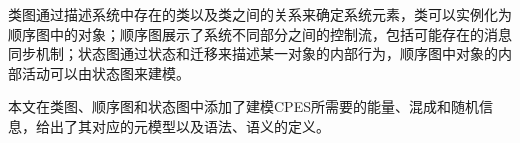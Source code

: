 	类图通过描述系统中存在的类以及类之间的关系来确定系统元素，类可以实例化为顺序图中的对象；顺序图展示了系统不同部分之间的控制流，包括可能存在的消息同步机制；状态图通过状态和迁移来描述某一对象的内部行为，顺序图中对象的内部活动可以由状态图来建模。
	
	本文在类图、顺序图和状态图中添加了建模CPES所需要的能量、混成和随机信息，给出了其对应的元模型以及语法、语义的定义。
	
		
	

	
	
	
